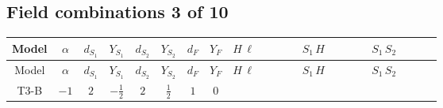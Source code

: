 \documentclass[8pt]{article}
\begin{document}
\begin{landscape}
\subsection*{Field combinations 3 of 10}
\begin{longtable}{@{}cccccccc >{\raggedright\arraybackslash}p{0.21\linewidth} >{\raggedright\arraybackslash}p{0.21\linewidth} >{\raggedright\arraybackslash}p{0.21\linewidth}@{}}
\toprule
Model & $\alpha$ & $d_{S_1}$ & $Y_{S_1}$ & $d_{S_2}$ & $Y_{S_2}$ & $d_F$ & $Y_F$ & $H\,\ell$ & $S_1\,H$ & $S_1\,S_2$ \\
\midrule
\endfirsthead
\toprule
Model & $\alpha$ & $d_{S_1}$ & $Y_{S_1}$ & $d_{S_2}$ & $Y_{S_2}$ & $d_F$ & $Y_F$ & $H\,\ell$ & $S_1\,H$ & $S_1\,S_2$ \\
\midrule
\endhead
T3-B & $-1$ & $2$ & $-\frac{1}{2}$ & $2$ & $\frac{1}{2}$ & $1$ & $0$ & \scriptsize\adjustbox{max width=\linewidth}{$\begin{gathered} +\frac{2 \hbar  \overline{y_{1,i_1,r_1}} \overline{y_{2,i_2,r_1}} L_{a_4,i_2}{}^T\, C\, P_L\, L_{a_2,i_1} H_{a_1} H_{a_3} \lambda_5 \epsilon_{a_1,a_2} \epsilon_{a_3,a_4}}{\sqrt{3} \epsilon  M_F} \\ +\frac{2 \hbar  \overline{y_{1,i_1,r_1}} \overline{y_{2,i_2,r_1}} L_{a_4,i_2}{}^T\, C\, P_L\, L_{a_2,i_1} H_{a_1} H_{a_3} \lambda_5 \epsilon_{a_1,a_2} \epsilon_{a_3,a_4}}{\sqrt{3} M_F} \\ +\frac{2 \hbar  \overline{\lambda_5} \overline{L_{a_3,i_1}}\, C\, P_R\, \overline{L_{a_4,i_2}}{}^T y_{1,i_1,r_1} y_{2,i_2,r_1} \epsilon_{a_1,a_3} \epsilon_{a_2,a_4} H_{a_1}{}^{\dagger } H_{a_2}{}^{\dagger }}{\sqrt{3} \epsilon  M_F}\end{gathered}$} & \scriptsize\adjustbox{max width=\linewidth}{$\begin{gathered} +\frac{2 \hbar  \overline{y_{2,i_1,r_1}} H_{a_1} H_{a_2} S_{1,j_1} S_{1,j_2} y_{1,i_1,r_1} \lambda_5 {\mathcal{I}_{y_2}}^{*}_{a_1,j_1} {\mathcal{I}_{y_2}}^{*}_{a_2,j_2}}{\sqrt{3} \epsilon } \\ +\frac{\hbar  \overline{y_{2,i_1,r_1}} H_{a_1} H_{a_2} S_{1,j_1} S_{1,j_2} y_{1,i_1,r_1} \lambda_5 {\mathcal{I}_{y_2}}^{*}_{a_1,j_1} {\mathcal{I}_{y_2}}^{*}_{a_2,j_2}}{\sqrt{3}} \\ -\frac{2 \hbar  \overline{y_{1,i_1,r_1}} \overline{Y_{e,i_2,i_3}} H_{a_2} S_{1,j_2} y_{1,i_2,r_1} Y_{e,i_1,i_3} \mathcal{I}_{y_1,a_1,j_2} {\mathcal{I}_{y_1}}^{*}_{a_2,j_1} H_{a_1}{}^{\dagger } S_{1,j_1}{}^{\dagger }}{\epsilon }\end{gathered}$} & \scriptsize\adjustbox{max width=\linewidth}{$\begin{gathered} +\text{CNewScalar1NewScalar2} \hbar  S_{1,j_1} S_{2,j_2} \text{Bar}(\text{cg1})_{j_1,j_2} \\ +\frac{1}{2} C_{S_2^\dagger S_2} \hbar  \overline{y_{2,i_1,r_1}} S_{1,j_1} S_{2,j_2} y_{1,i_1,r_1} \text{Bar}(\text{cg1})_{j_1,j_2} \\ +\frac{C_{S_2^\dagger S_2} \hbar  \overline{y_{2,i_1,r_1}} S_{1,j_1} S_{2,j_2} y_{1,i_1,r_1} \text{Bar}(\text{cg1})_{j_1,j_2}}{\epsilon }\end{gathered}$} \\

\end{longtable}
\end{landscape}
\end{document}
